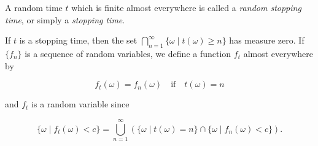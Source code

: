 A random time $t$ which is finite almost everywhere is called a \emph{random stopping time}, or simply a \emph{stopping time}.

If $t$ is a stopping time, then the set $\bigcap_{n=1}^{\infty} \{\omega \mid t(\omega) \geq n\}$ has measure zero. If $\{f_n\}$ is a sequence of random variables, we define a function $f_t$ almost everywhere by

$$f_t(\omega) = f_n(\omega) \quad \text{if} \quad t(\omega) = n$$

and $f_t$ is a random variable since

$$\{\omega \mid f_t(\omega) < c\} = \bigcup_{n=1}^{\infty} \left(\{\omega \mid t(\omega) = n\} \cap \{\omega \mid f_n(\omega) < c\}\right).$$
